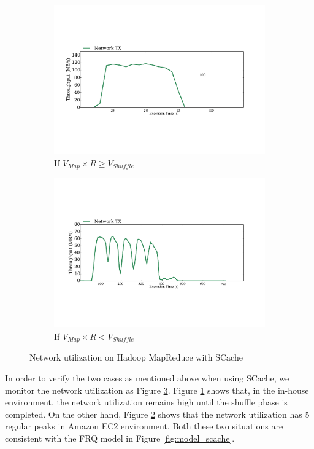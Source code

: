 {\begin{figure}
	\centering
	\begin{subfigure}{.42\linewidth}
		\includegraphics[width=\linewidth]{fig/hadoop_net1}
		\caption{\color{blue}If \(V_{Map} \times R \ge V_{Shuffle}\)}
		\label{fig:hadoop_net1}
	\end{subfigure}
	\begin{subfigure}{.42\linewidth}
		\includegraphics[width=\linewidth]{fig/hadoop_net2}
		\caption{\color{blue}If \(V_{Map} \times R < V_{Shuffle}\)}
		\label{fig:hadoop_net2}
	\end{subfigure}
	\caption{\color{blue}Network utilization on Hadoop MapReduce with SCache}
	\label{fig:hadoop_net}
\end{figure}

In order to verify the two cases as mentioned above when using SCache, we monitor the network utilization as Figure \ref{fig:hadoop_net}. Figure \ref{fig:hadoop_net1} shows that, in the in-house environment, the network utilization remains high until the shuffle phase is completed. On the other hand, Figure \ref{fig:hadoop_net2} shows that the network utilization has 5 regular peaks in Amazon EC2 environment. 
Both these two situations are consistent with the FRQ model in Figure \ref{fig:model_scache}. 

}
